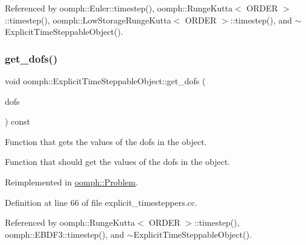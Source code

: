 Referenced by oomph\+::\+Euler\+::timestep(), oomph\+::\+Runge\+Kutta$<$ O\+R\+D\+E\+R $>$\+::timestep(), oomph\+::\+Low\+Storage\+Runge\+Kutta$<$ O\+R\+D\+E\+R $>$\+::timestep(), and $\sim$\+Explicit\+Time\+Steppable\+Object().

\mbox{\label{classoomph_1_1ExplicitTimeSteppableObject_a0fcf43487590dd723f25184067f26219}} 
\subsubsection{\texorpdfstring{get\+\_\+dofs()}{get\_dofs()}\hspace{0.1cm}{\footnotesize\ttfamily [1/2]}}
{\footnotesize\ttfamily void oomph\+::\+Explicit\+Time\+Steppable\+Object\+::get\+\_\+dofs (\begin{DoxyParamCaption}\item[{\hyperlink{classoomph_1_1DoubleVector}{Double\+Vector} \&}]{dofs }\end{DoxyParamCaption}) const\hspace{0.3cm}{\ttfamily [virtual]}}



Function that gets the values of the dofs in the object. 

Function that should get the values of the dofs in the object. 

Reimplemented in \hyperlink{classoomph_1_1Problem_ae2ef66732d76053dba15001818c0605c}{oomph\+::\+Problem}.



Definition at line 66 of file explicit\+\_\+timesteppers.\+cc.



Referenced by oomph\+::\+Runge\+Kutta$<$ O\+R\+D\+E\+R $>$\+::timestep(), oomph\+::\+E\+B\+D\+F3\+::timestep(), and $\sim$\+Explicit\+Time\+Steppable\+Object().

\mbox{\label{classoomph_1_1ExplicitTimeSteppableObject_a370d8d077bb5e07290f4c2f31183d8d2}} 
